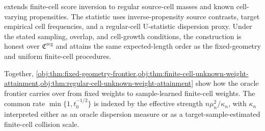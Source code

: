  extends finite-cell score inversion to regular source-cell masses and known cell-varying propensities.  The statistic uses inverse-propensity source contrasts, target empirical cell frequencies, and a regular-cell U-statistic dispersion proxy.  Under the stated sampling, overlap, and cell-growth conditions, the construction is honest over \(\mathfrak C^{\mathrm{reg}}\) and attains the same expected-length order as the fixed-geometry and uniform finite-cell procedures.

Together, \cref{obj:thm:fixed-geometry-frontier,obj:thm:finite-cell-unknown-weight-attainment,obj:thm:regular-cell-unknown-weight-attainment} show how the oracle frontier carries over from fixed weights to sample-learned finite-cell weights.  The common rate \(\min\{1,t_0^{-1/2}\}\) is indexed by the effective strength \(n\mu_n^2/\kappa_n\), with \(\kappa_n\) interpreted either as an oracle dispersion measure or as a target-sample-estimated finite-cell collision scale.
